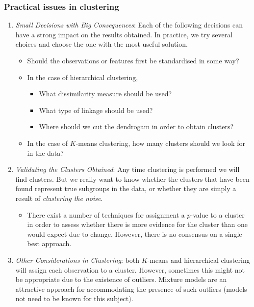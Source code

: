 \documentclass[11pt]{article}
\begin{document}
\subsubsection{Practical issues in clustering}
\begin{enumerate}
    \item \textit{Small Decisions with Big Consequences}: Each of the following decisions can have a strong impact on the results obtained. In practice, we try several choices and choose the one with the most useful solution.
        \begin{itemize}
            \item Should the observations or features first be standardised in some way?
            \item In the case of hierarchical clustering,
                \begin{itemize}
                    \item What dissimilarity measure should be used?
                    \item What type of linkage should be used?
                    \item Where should we cut the dendrogam in order to obtain clusters?
                \end{itemize}
            \item In the case of $K$-means clustering, how many clusters should we look for in the data?
        \end{itemize}
    \item \textit{Validating the Clusters Obtained}: Any time clustering is performed we will find clusters. But we really want to know whether the clusters that have been found represent true subgroups in the data, or whether they are simply a result of \textit{clustering the noise}.
        \begin{itemize}
            \item There exist a number of techniques for assignment a $p$-value to a cluster in order to assess whether there is more evidence for the cluster than one would expect due to change. However, there is no consensus on a single best approach.
        \end{itemize}
    \item \textit{Other Considerations in Clustering}: both $K$-means and hierarchical clustering will assign each observation to a cluster. However, sometimes this might not be appropriate due to the existence of outliers. Mixture models are an attractive approach for accommodating the presence of such outliers (models not need to be known for this subject).
\end{enumerate}
\end{document}
